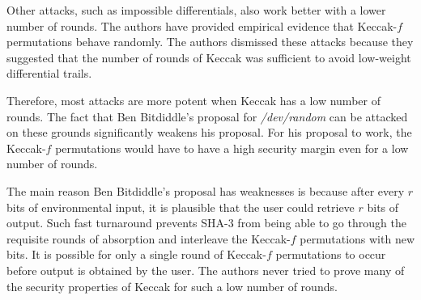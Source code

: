 \documentclass[psamsfonts]{amsart}
\begin{document}
Other attacks, such as impossible differentials, also work better with a lower number of rounds. The authors have provided empirical evidence that Keccak-$f$ permutations behave randomly. The authors dismissed these attacks because they suggested that the number of rounds of Keccak was sufficient to avoid low-weight differential trails.

Therefore, most attacks are more potent when Keccak has a low number of rounds. The fact that Ben Bitdiddle's proposal for \emph{/dev/random} can be attacked on these grounds significantly weakens his proposal. For his proposal to work, the Keccak-$f$ permutations would have to have a high security margin even for a low number of rounds.

The main reason Ben Bitdiddle's proposal has weaknesses is because after every $r$ bits of environmental input, it is plausible that the user could retrieve $r$ bits of output. Such fast turnaround prevents SHA-3 from being able to go through the requisite rounds of absorption and interleave the Keccak-$f$ permutations with new bits. It is possible for only a single round of Keccak-$f$ permutations to occur before output is obtained by the user. The authors never tried to prove many of the security properties of Keccak for such a low number of rounds.
\end{document}
